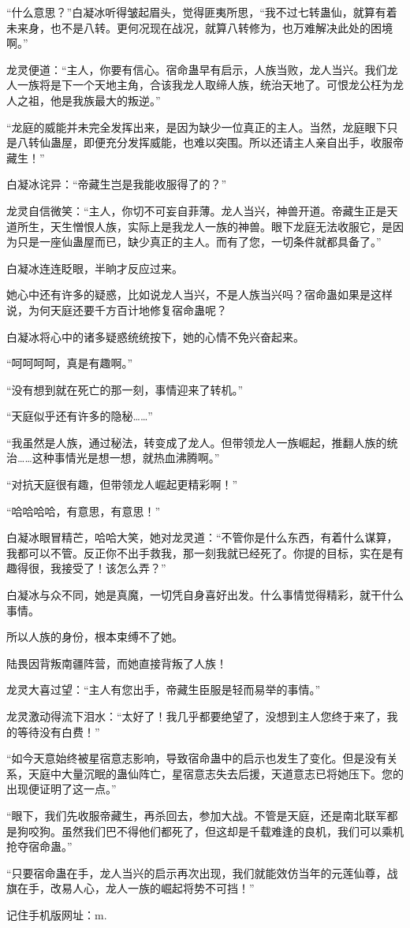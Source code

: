 \begin{this_body}
“什么意思？”白凝冰听得皱起眉头，觉得匪夷所思，“我不过七转蛊仙，就算有着未来身，也不是八转。更何况现在战况，就算八转修为，也万难解决此处的困境啊。”

龙灵便道：“主人，你要有信心。宿命蛊早有启示，人族当败，龙人当兴。我们龙人一族将是下一个天地主角，合该我龙人取缔人族，统治天地了。可恨龙公枉为龙人之祖，他是我族最大的叛逆。”

“龙庭的威能并未完全发挥出来，是因为缺少一位真正的主人。当然，龙庭眼下只是八转仙蛊屋，即便充分发挥威能，也难以突围。所以还请主人亲自出手，收服帝藏生！”

白凝冰诧异：“帝藏生岂是我能收服得了的？”

龙灵自信微笑：“主人，你切不可妄自菲薄。龙人当兴，神兽开道。帝藏生正是天道所生，天生憎恨人族，实际上是我龙人一族的神兽。眼下龙庭无法收服它，是因为只是一座仙蛊屋而已，缺少真正的主人。而有了您，一切条件就都具备了。”

白凝冰连连眨眼，半晌才反应过来。

她心中还有许多的疑惑，比如说龙人当兴，不是人族当兴吗？宿命蛊如果是这样说，为何天庭还要千方百计地修复宿命蛊呢？

白凝冰将心中的诸多疑惑统统按下，她的心情不免兴奋起来。

“呵呵呵呵，真是有趣啊。”

“没有想到就在死亡的那一刻，事情迎来了转机。”

“天庭似乎还有许多的隐秘……”

“我虽然是人族，通过秘法，转变成了龙人。但带领龙人一族崛起，推翻人族的统治……这种事情光是想一想，就热血沸腾啊。”

“对抗天庭很有趣，但带领龙人崛起更精彩啊！”

“哈哈哈哈，有意思，有意思！”

白凝冰眼冒精芒，哈哈大笑，她对龙灵道：“不管你是什么东西，有着什么谋算，我都可以不管。反正你不出手救我，那一刻我就已经死了。你提的目标，实在是有趣得很，我接受了！该怎么弄？”

白凝冰与众不同，她是真魔，一切凭自身喜好出发。什么事情觉得精彩，就干什么事情。

所以人族的身份，根本束缚不了她。

陆畏因背叛南疆阵营，而她直接背叛了人族！

龙灵大喜过望：“主人有您出手，帝藏生臣服是轻而易举的事情。”

龙灵激动得流下泪水：“太好了！我几乎都要绝望了，没想到主人您终于来了，我的等待没有白费！”

“如今天意始终被星宿意志影响，导致宿命蛊中的启示也发生了变化。但是没有关系，天庭中大量沉眠的蛊仙阵亡，星宿意志失去后援，天道意志已将她压下。您的出现便证明了这一点。”

“眼下，我们先收服帝藏生，再杀回去，参加大战。不管是天庭，还是南北联军都是狗咬狗。虽然我们巴不得他们都死了，但这却是千载难逢的良机，我们可以乘机抢夺宿命蛊。”

“只要宿命蛊在手，龙人当兴的启示再次出现，我们就能效仿当年的元莲仙尊，战旗在手，改易人心，龙人一族的崛起将势不可挡！”

记住手机版网址：m.

\end{this_body}

